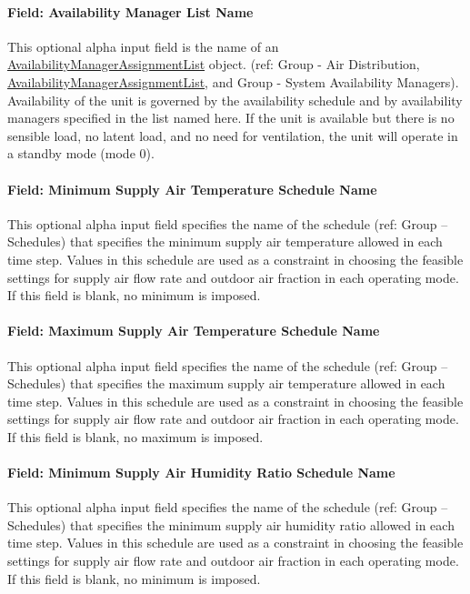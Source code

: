 \paragraph{Field: Availability Manager List Name}
This optional alpha input field is the name of an \hyperref[availabilitymanagerassignmentlist]{AvailabilityManagerAssignmentList} object.
(ref: Group - Air Distribution, \hyperref[availabilitymanagerassignmentlist]{AvailabilityManagerAssignmentList}, and Group - System Availability Managers). Availability of the unit is governed by the availability schedule and by availability managers specified in the list named here. If the unit is available but there is no sensible load, no latent load, and no need for ventilation, the unit will operate in a standby mode (mode 0).

\paragraph{Field: Minimum Supply Air Temperature Schedule Name}
This optional alpha input field specifies the name of the schedule (ref: Group – Schedules) that specifies the minimum supply air temperature allowed in each time step. Values in this schedule are used as a constraint in choosing the feasible settings for supply air flow rate and outdoor air fraction in each operating mode. If this field is blank, no minimum is imposed.

\paragraph{Field: Maximum Supply Air Temperature Schedule Name}
This optional alpha input field specifies the name of the schedule (ref: Group – Schedules) that specifies the maximum supply air temperature allowed in each time step. Values in this schedule are used as a constraint in choosing the feasible settings for supply air flow rate and outdoor air fraction in each operating mode. If this field is blank, no maximum is imposed.

\paragraph{Field: Minimum Supply Air Humidity Ratio Schedule Name}
This optional alpha input field specifies the name of the schedule (ref: Group – Schedules) that specifies the minimum supply air humidity ratio allowed in each time step. Values in this schedule are used as a constraint in choosing the feasible settings for supply air flow rate and outdoor air fraction in each operating mode. If this field is blank, no minimum is imposed.

